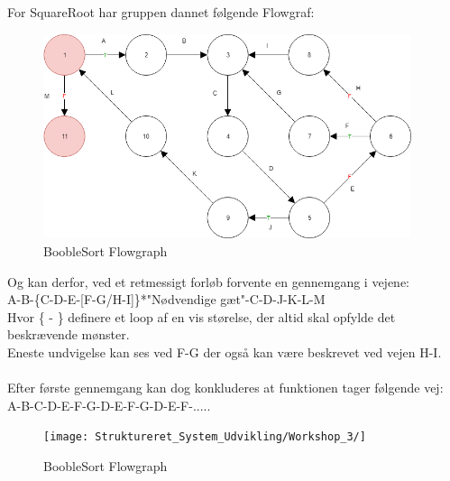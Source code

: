 \documentclass[11pt]{article}
\begin{document}
    \noindent
    For SquareRoot har gruppen dannet følgende Flowgraf:\\
    \begin{subfigure}{1\textwidth}
        \centering
        \includegraphics[width=0.8\linewidth, height=6cm]{Struktureret_System_Udvikling/Workshop_3/SquareRoot_FlowGraph.png}
        \caption{BoobleSort Flowgraph}
        \label{fig:BoobleSortGraph}
    \end{subfigure}
    Og kan derfor, ved et retmessigt forløb forvente en gennemgang i vejene:\\
    A-B-\{C-D-E-[F-G/H-I]\}*"Nødvendige gæt"-C-D-J-K-L-M\\
    Hvor \{ - \} definere et loop af en vis størelse, der altid skal opfylde det beskrævende mønster.\\
    Eneste undvigelse kan ses ved F-G der også kan være beskrevet ved vejen H-I.\\
    \\
    Efter første gennemgang kan dog konkluderes at funktionen tager følgende vej:\\
    A-B-C-D-E-F-G-D-E-F-G-D-E-F-.....
    
    \begin{subfigure}{1\textwidth}
        \centering
        \texttt{[image: Struktureret\_System\_Udvikling/Workshop\_3/]}
        \caption{BoobleSort Flowgraph}
        \label{fig:BoobleSortGraph}
    \end{subfigure}
    
\end{document}
